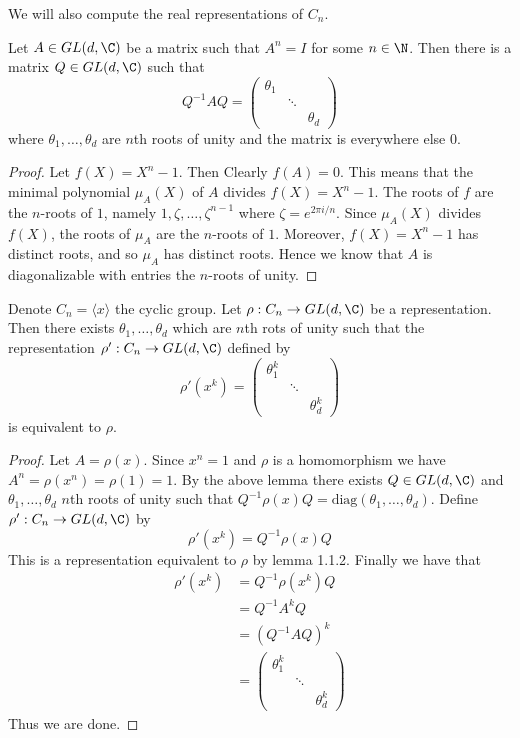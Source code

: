 \documentclass[a4paper]{article}
\begin{document}
We will also compute the real representations of $C_n$. 

\begin{lmm}{}{} Let $A\in GL(d,\C)$ be a matrix such that $A^n=I$ for some $n\in\N$. Then there is a matrix $Q\in GL(d,\C)$ such that $$Q^{-1}AQ=\begin{pmatrix}
\theta_1 & & \\
& \ddots &\\
& & \theta_d
\end{pmatrix}$$ where $\theta_1,\dots,\theta_d$ are $n$th roots of unity and the matrix is everywhere else $0$. \tcbline
\begin{proof}
Let $f(X)=X^n-1$. Then Clearly $f(A)=0$. This means that the minimal polynomial $\mu_A(X)$ of $A$ divides $f(X)=X^n-1$. The roots of $f$ are the $n$-roots of $1$, namely $1,\zeta,\dots,\zeta^{n-1}$ where $\zeta=e^{2\pi i/n}$. Since $\mu_A(X)$ divides $f(X)$, the roots of $\mu_A$ are the $n$-roots of $1$. Moreover, $f(X)=X^n-1$ has distinct roots, and so $\mu_A$ has distinct roots. Hence we know that $A$ is diagonalizable with entries the $n$-roots of unity. 
\end{proof}
\end{lmm}

\begin{thm}{}{} Denote $C_n=\langle x\rangle$ the cyclic group. Let $\rho:C_n\to GL(d,\C)$ be a representation. Then there exists $\theta_1,\dots,\theta_d$ which are $n$th rots of unity such that the representation $\rho':C_n\to GL(d,\C)$ defined by $$\rho'(x^k)=\begin{pmatrix}
\theta_1^k & & \\
& \ddots &\\
& & \theta_d^k
\end{pmatrix}$$ is equivalent to $\rho$. \tcbline
\begin{proof}
Let $A=\rho(x)$. Since $x^n=1$ and $\rho$ is a homomorphism we have $A^n=\rho(x^n)=\rho(1)=1$. By the above lemma there exists $Q\in GL(d,\C)$ and $\theta_1,\dots,\theta_d$ $n$th roots of unity such that $Q^{-1}\rho(x)Q=\text{diag}(\theta_1,\dots,\theta_d)$. Define $\rho':C_n\to GL(d,\C)$ by $$\rho'(x^k)=Q^{-1}\rho(x)Q$$ This is a representation equivalent to $\rho$ by lemma 1.1.2. Finally we have that 
\begin{align*}
\rho'(x^k)&=Q^{-1}\rho(x^k)Q\\
&=Q^{-1}A^kQ\\
&=(Q^{-1}AQ)^k\\
&=\begin{pmatrix}
\theta_1^k & & \\
& \ddots &\\
& & \theta_d^k
\end{pmatrix}
\end{align*} Thus we are done. 
\end{proof}
\end{thm}
\end{document}
